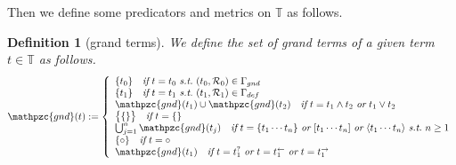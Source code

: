 \documentclass[12pt]{article}
\newtheorem{Definition}{Definition}[section]
\begin{document}
Then we define some predicators and metrics on $\mathbb{T}$ as follows.

\begin{Definition}[grand terms]
  We define the set of grand terms of a given term $t \in \mathbb{T}$ as
  follows.
  \begin{displaymath}
    \mathpzc{gnd}(t) := \left\{\begin{array}{l}
      \{t_0\} \quad \text{\it if}\ t = t_0\
       \text{\it s.t.}\ (t_0,\mathcal{R}_0) \in \Gamma_{gnd}  \\
      \{t_1\} \quad \text{\it if}\ t = t_1\
       \text{\it s.t.}\ (t_1,\mathcal{R}_1) \in \Gamma_{def}  \\
      \mathpzc{gnd}(t_1) \cup \mathpzc{gnd}(t_2) \quad \text{\it if}\ t = t_1
       \wedge t_2\ \text{\it or}\ t_1 \vee t_2  \\
      \bigl\{ \{\} \bigr\} \quad \text{\it if}\ t = \{\}  \\
       \bigcup_{j=1}^{n}\mathpzc{gnd}(t_j) \quad \text{\it if}\
      t = \{t_1 \cdots t_n\}\ \text{\it or}\ [t_1 \cdots t_n]\ \text{\it or}\
       \langle t_1 \cdots t_n \rangle\ \text{\it s.t.}\ n \ge 1  \\
      \{\circ\} \quad \text{\it if}\ t = \circ  \\
       \mathpzc{gnd}(t_1) \quad \text{\it if}\ t = t_1^?\ \text{\it or}\
      t = t_1^{\leftarrow}\ \text{\it or}\ t = t_1^{\rightarrow}
    \end{array}\right.
  \end{displaymath}
\end{Definition}
\end{document}
